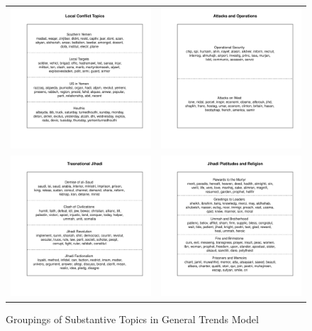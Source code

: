 \begin{figure}
\begin{center}
  \caption{Groupings of Substantive Topics in General Trends Model}
  \label{fig:topicSumsED}
  \begin{tabular}{cc}
 \includegraphics[width=.49\columnwidth]{./Pictures/dayModel_UT70_cluster1.pdf}&  
\includegraphics[width=.49\columnwidth]{./Pictures/dayModel_UT70_cluster2.pdf}\\
\vspace{-1.00cm}
\includegraphics[width=.49\columnwidth]{./Pictures/dayModel_UT70_cluster3.pdf}&  
\includegraphics[width=.49\columnwidth]{./Pictures/dayModel_UT70_cluster4.pdf} \\

\end{tabular}
\end{center}
\end{figure}
